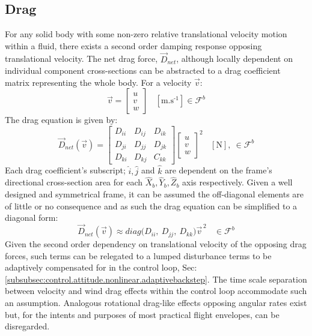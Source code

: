 \subsection{Drag}
\label{subsec:dynamics.aero.drag}
For any solid body with some non-zero relative translational velocity motion within a fluid, there exists a second order damping response opposing translational velocity. The net drag force, $\vec{D}_{net}$, although locally dependent on individual component cross-sections can be abstracted to a drag coefficient matrix representing the whole body. For a velocity $\vec{v}$:
\begin{equation}
\vec{v}=\begin{bmatrix}
u\\
v\\
w
\end{bmatrix}~~~~[\text{m.s}^{\text{-}1}]\in\mathcal{F}^{b}
\end{equation}
The drag equation is given by:
\begin{equation}\label{eq:distrubance}
\vec{D}_{net}(\vec{v})=\begin{bmatrix}
D_{ii} & D_{ij} & D_{ik}\\
D_{ji} & D_{jj} & D_{jk}\\
D_{ki} & D_{kj} & C_{kk}
\end{bmatrix}
\begin{bmatrix}
u\\
v\\
w
\end{bmatrix}^2
~~~~[\text{N}],~\in\mathcal{F}^b
\end{equation}
Each drag coefficient's subscript; $\hat{i},\hat{j}$ and $\hat{k}$ are dependent on the frame's directional cross-section area for each $\hat{X}_b,\hat{Y}_b,\hat{Z}_b$ axis respectively. Given a well designed and symmetrical frame, it can be assumed the off-diagonal elements are of little or no consequence and as such the drag equation can be simplified to a diagonal form:
\begin{equation}
\vec{D}_{net}(\vec{v})\approx diag\big(D_{ii},~D_{jj},~D_{kk}\big)\vec{v}^{\hspace{2pt}2}~~~~\in\mathcal{F}^b
\end{equation}
Given the second order dependency on translational velocity of the opposing drag forces, such terms can be relegated to a lumped disturbance terms to be adaptively compensated for in the control loop, Sec:\ref{subsubsec:control.attitude.nonlinear.adaptivebackstep}. The time scale separation between velocity and wind drag effects within the control loop accommodate such an assumption. Analogous rotational drag-like effects opposing angular rates exist but, for the intents and purposes of most practical flight envelopes, can be disregarded.
